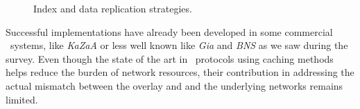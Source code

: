 \begin{figure}[ht]
\centering
{}\qquad\qquad
{}
\caption{Index and data replication strategies.}
\label{figure:replication}
\end{figure}
Successful implementations have
already been developed in some commercial \p\ systems, like 
\emph{KaZaA} or less well known like \emph{Gia} and \emph{BNS} as we saw during
the survey.
Even though the state of the art in \p\ protocols using caching methods
helps reduce the burden of network resources, 
their contribution in addressing the actual mismatch between the overlay and
and the underlying networks remains limited.

